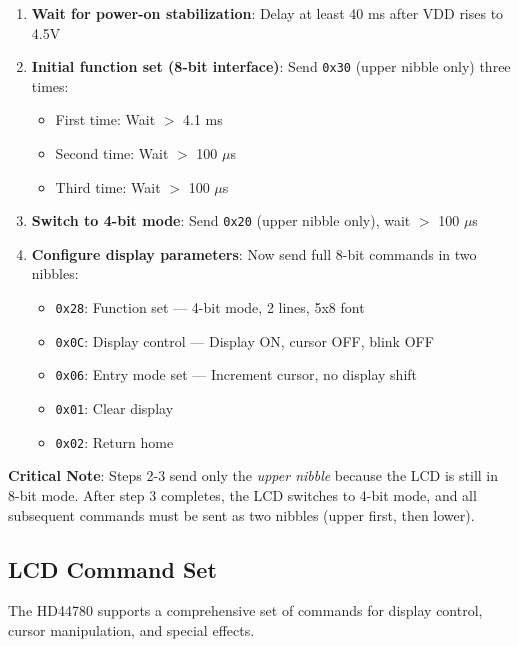 \begin{enumerate}[nosep]
  \item \textbf{Wait for power-on stabilization}: Delay at least 40 ms after VDD rises to 4.5V
  \item \textbf{Initial function set (8-bit interface)}: Send \texttt{0x30} (upper nibble only) three times:
    \begin{itemize}[nosep]
      \item First time: Wait $>$ 4.1 ms
      \item Second time: Wait $>$ 100 $\mu$s
      \item Third time: Wait $>$ 100 $\mu$s
    \end{itemize}
  \item \textbf{Switch to 4-bit mode}: Send \texttt{0x20} (upper nibble only), wait $>$ 100 $\mu$s
  \item \textbf{Configure display parameters}: Now send full 8-bit commands in two nibbles:
    \begin{itemize}[nosep]
      \item \texttt{0x28}: Function set — 4-bit mode, 2 lines, 5x8 font
      \item \texttt{0x0C}: Display control — Display ON, cursor OFF, blink OFF
      \item \texttt{0x06}: Entry mode set — Increment cursor, no display shift
      \item \texttt{0x01}: Clear display
      \item \texttt{0x02}: Return home
    \end{itemize}
\end{enumerate}

\noindent
\textbf{Critical Note}: Steps 2-3 send only the \textit{upper nibble} because the LCD is still in 8-bit mode. After step 3 completes, the LCD switches to 4-bit mode, and all subsequent commands must be sent as two nibbles (upper first, then lower).

\subsection{LCD Command Set}

The HD44780 supports a comprehensive set of commands for display control, cursor manipulation, and special effects.

